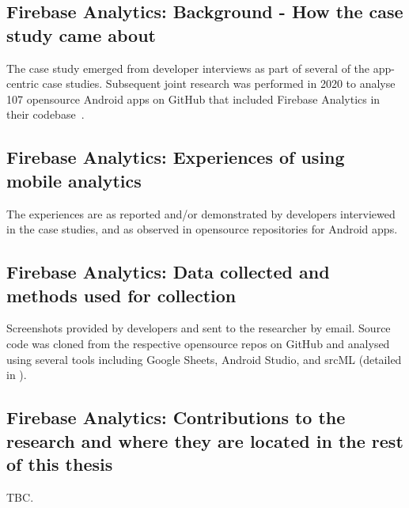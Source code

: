
\subsection{Firebase Analytics: Background - How the case study came about}
The case study emerged from developer interviews as part of several of the app-centric case studies. Subsequent joint research was performed in 2020 to analyse 107 opensource Android apps on GitHub that included Firebase Analytics in their codebase~\citep{harty2021_logging_practices_with_mobile_analytics}.

\subsection{Firebase Analytics: Experiences of using mobile analytics}
The experiences are as reported and/or demonstrated by developers interviewed in the case studies, and as observed in opensource repositories for Android apps.

\subsection{Firebase Analytics: Data collected and methods used for collection}
Screenshots provided by developers and sent to the researcher by email. Source code was cloned from the respective opensource repos on GitHub and analysed using several tools including Google Sheets, Android Studio, and srcML (detailed in \citet{harty2021_logging_practices_with_mobile_analytics}).

\subsection{Firebase Analytics: Contributions to the research and where they are located in the rest of this thesis}
TBC.


\clearpage

